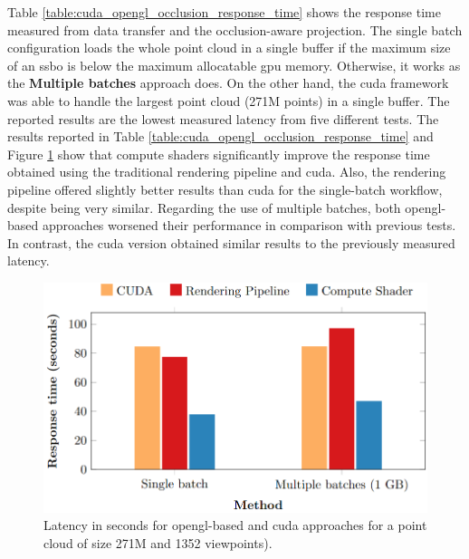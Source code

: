 Table \ref{table:cuda_opengl_occlusion_response_time} shows the response time measured from data transfer and the occlusion-aware projection. The single batch configuration loads the whole point cloud in a single buffer if the maximum size of an \acrshort{ssbo} is below the maximum allocatable \acrshort{gpu} memory. Otherwise, it works as the \textbf{Multiple batches} approach does. On the other hand, the \acrshort{cuda} framework was able to handle the largest point cloud (271M points) in a single buffer. The reported results are the lowest measured latency from five different tests. The results reported in Table \ref{table:cuda_opengl_occlusion_response_time} and Figure \ref{fig:cuda_opengl_occlusion_response_time} show that compute shaders significantly improve the response time obtained using the traditional rendering pipeline and \acrshort{cuda}. Also, the rendering pipeline offered slightly better results than \acrshort{cuda} for the single-batch workflow, despite being very similar. Regarding the use of multiple batches, both \acrshort{opengl}-based approaches worsened their performance in comparison with previous tests. In contrast, the \acrshort{cuda} version obtained similar results to the previously measured latency. 

\begin{figure}[ht]
    \includegraphics[width=.8\linewidth]{figs/multi_thermal_projection/results/response_time_cuda_opengl.png}
    \caption{Latency in seconds for \acrshort{opengl}-based and \acrshort{cuda} approaches for a point cloud of size 271M and 1352 viewpoints).}
    \label{fig:cuda_opengl_occlusion_response_time}
\end{figure}

